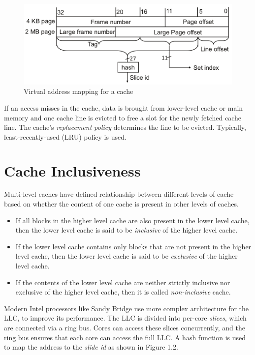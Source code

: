 \documentclass[a4paper,12pt, final]{report}
\begin{document}
\begin{figure}[h]
    \centering
    \includegraphics[scale=0.4]{images/sliced_cache.png}
    \caption{Virtual address mapping for a cache \cite{prime_probe_llc}}
\end{figure}

If an access misses in the cache, data is brought from lower-level cache or main memory and one cache line is evicted to free a slot for the newly fetched cache line. The cache's \textit{replacement policy} determines the line to be evicted. Typically, least-recently-used (LRU) policy is used.

\section{Cache Inclusiveness}
Multi-level caches have defined relationship between different levels of cache based on whether the content of one cache is present in other levels of caches.

\begin{itemize}
    \item If all blocks in the higher level cache are also present in the lower level cache, then the lower level cache is said to be \textit{inclusive} of the higher level cache.
    \item If the lower level cache contains only blocks that are not present in the higher level cache, then the lower level cache is said to be \textit{exclusive} of the higher level cache.
    \item If the contents of the lower level cache are neither strictly inclusive nor exclusive of the higher level cache, then it is called \textit{non-inclusive} cache.
\end{itemize}

Modern Intel processors like Sandy Bridge use more complex architecture for the LLC, to improve its performance. The LLC is divided into per-core \textit{slices}, which are connected via a ring bus. Cores can access these slices concurrently, and the ring bus ensures that each core can access the full LLC. A hash function is used to map the address to the \textit{slide id} as shown in Figure 1.2.
\end{document}
